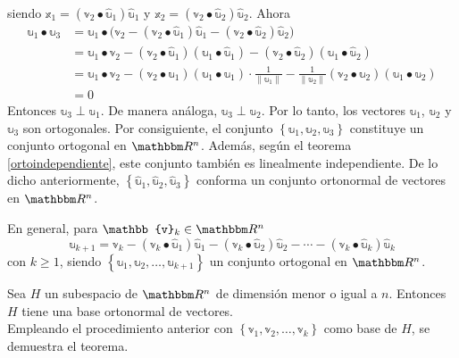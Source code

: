 \noindent siendo $\mathbb{x}_1 = (\mathbb{v}_2 \bullet \hat{\mathbb{u}}_1) \hat{\mathbb{u}}_1$ y $\mathbb{x}_2 =(\mathbb{v}_2 \bullet \hat{\mathbb{u}}_2)\hat{\mathbb{u}}_2$. Ahora
\begin{align*}
    \mathbb{u}_1 \bullet \mathbb{u}_3 & = \mathbb{u}_1 \bullet \big( \mathbb{v}_2 - (\mathbb{v}_2 \bullet \hat{\mathbb{u}}_1) \hat{\mathbb{u}}_1 - (\mathbb{v}_2 \bullet \hat{\mathbb{u}}_2)\hat{\mathbb{u}}_2 \big) \\
    & = \mathbb{u}_1 \bullet \mathbb{v}_2 - (\mathbb{v}_2 \bullet \hat{\mathbb{u}}_1)(\mathbb{u}_1 \bullet \hat{\mathbb{u}}_1) - (\mathbb{v}_2 \bullet \hat{\mathbb{u}}_2)(\mathbb{u}_1 \bullet \hat{\mathbb{u}}_2) \\
    & = \mathbb{u}_1 \bullet \mathbb{v}_2 - (\mathbb{v}_2 \bullet \mathbb{u}_1)(\mathbb{u}_1 \bullet \mathbb{u}_1) \cdot \frac{1}{\| \mathbb{u}_1 \|} - \frac{1}{\| \mathbb{u}_2 \|} (\mathbb{v}_2 \bullet \mathbb{u}_2)(\mathbb{u}_1 \bullet \mathbb{u}_2) \\
    & = 0
\end{align*}
Entonces $\mathbb{u}_3 \perp \mathbb{u}_1$. De manera análoga, $\mathbb{u}_3 \perp \mathbb{u}_2$. Por lo tanto, los vectores \( \mathbb{u}_1 \), \( \mathbb{u}_2 \) y $\mathbb{u}_3$ son ortogonales. Por consiguiente, el conjunto \( \left\{ \mathbb{u}_1, \mathbb{u}_2, \mathbb{u}_3 \right\} \) constituye un conjunto ortogonal en \( \RR[n] \). Además, según el teorema \ref{ortoindependiente}, este conjunto también es linealmente independiente. De lo dicho anteriormente, $\left\{ \hat{\mathbb{u}}_1, \hat{\mathbb{u}}_2, \hat{\mathbb{u}}_3 \right\}$ conforma un conjunto ortonormal de vectores en $\RR[n]$.

En general, para $\mathbb{v}_k \in \RR[n]$
$$\mathbb{u}_{k+1} = \mathbb{v}_k - (\mathbb{v}_k \bullet \hat{\mathbb{u}}_1)\hat{\mathbb{u}}_1 - (\mathbb{v}_k \bullet \hat{\mathbb{u}}_2)\hat{\mathbb{u}}_2 - \cdots - (\mathbb{v}_k \bullet \hat{\mathbb{u}}_k)\hat{\mathbb{u}}_k$$\newpage\noindent
con $k \geq 1$, siendo $\left\{ \mathbb{u}_1, \mathbb{u}_2, \dots, \mathbb{u}_{k+1} \right\}$ un conjunto ortogonal en $\RR[n]$.

\begin{theorem}
    Sea $H$ un subespacio de $\RR[n]$ de dimensión menor o igual a $n$. Entonces $H$ tiene una base ortonormal de vectores. \\
    \demostracion Empleando el procedimiento anterior con $\left\{ \mathbb{v}_1, \mathbb{v}_2, \dots, \mathbb{v}_k \right\}$ como base de $H$, se demuestra el teorema.
\end{theorem}

